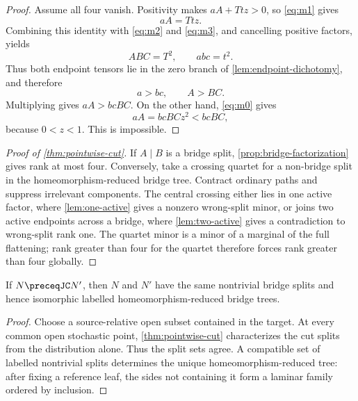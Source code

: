 \begin{proof}
Assume all four vanish.  Positivity makes $aA+Ttz>0$, so \eqref{eq:m1} gives
\[
aA=Ttz.
\]
Combining this identity with \eqref{eq:m2} and \eqref{eq:m3}, and cancelling positive factors, yields
\[
ABC=T^2,
\qquad
abc=t^2.
\]
Thus both endpoint tensors lie in the zero branch of \cref{lem:endpoint-dichotomy}, and therefore
\[
a>bc,
\qquad
A>BC.
\]
Multiplying gives $aA>bcBC$.  On the other hand, \eqref{eq:m0} gives
\[
aA=bcBCz^2<bcBC,
\]
because $0<z<1$.  This is impossible.
\end{proof}

\begin{proof}[Proof of \cref{thm:pointwise-cut}]
If $A\mid B$ is a bridge split, \cref{prop:bridge-factorization} gives rank at most four.  Conversely, take a crossing quartet for a non-bridge split in the homeomorphism-reduced bridge tree.  Contract ordinary paths and suppress irrelevant components.  The central crossing either lies in one active factor, where \cref{lem:one-active} gives a nonzero wrong-split minor, or joins two active endpoints across a bridge, where \cref{lem:two-active} gives a contradiction to wrong-split rank one.  The quartet minor is a minor of a marginal of the full flattening; rank greater than four for the quartet therefore forces rank greater than four globally.
\end{proof}

\begin{corollary}\label{cor:cut-preservation}
If $N\preceqJC N'$, then $N$ and $N'$ have the same nontrivial bridge splits and hence isomorphic labelled homeomorphism-reduced bridge trees.
\end{corollary}

\begin{proof}
Choose a source-relative open subset contained in the target.  At every common open stochastic point, \cref{thm:pointwise-cut} characterizes the cut splits from the distribution alone.  Thus the split sets agree.  A compatible set of labelled nontrivial splits determines the unique homeomorphism-reduced tree: after fixing a reference leaf, the sides not containing it form a laminar family ordered by inclusion.
\end{proof}
